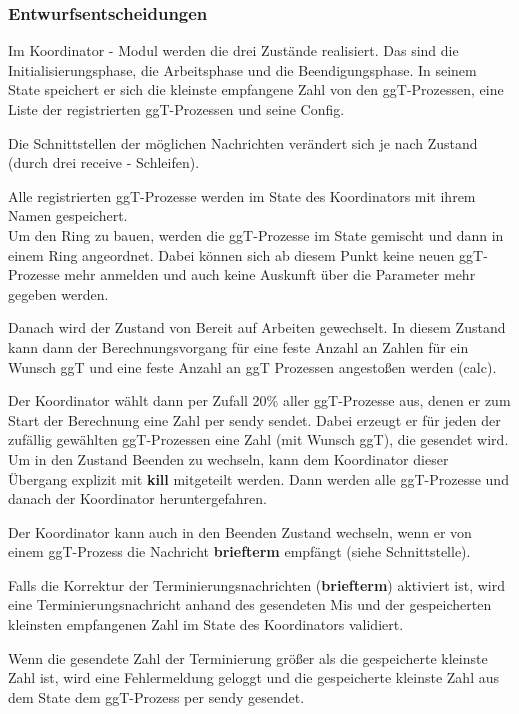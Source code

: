 \documentclass{article}
\begin{document}
\subsubsection{Entwurfsentscheidungen}
Im Koordinator - Modul werden die drei Zustände realisiert. Das sind die Initialisierungsphase, die Arbeitsphase und
die Beendigungsphase. In seinem State speichert er sich die kleinste empfangene Zahl von den ggT-Prozessen, eine Liste
der registrierten ggT-Prozessen und seine Config.

Die Schnittstellen der möglichen Nachrichten verändert sich je nach Zustand (durch drei receive - Schleifen).

Alle registrierten ggT-Prozesse werden im State des Koordinators mit ihrem Namen gespeichert.\\

Um den Ring zu bauen, werden die ggT-Prozesse im State gemischt und dann in einem Ring angeordnet. Dabei können sich
ab diesem Punkt keine neuen ggT-Prozesse mehr anmelden und auch keine Auskunft über die Parameter mehr gegeben werden.

Danach wird der Zustand von Bereit auf Arbeiten gewechselt. In diesem Zustand kann dann der Berechnungsvorgang für eine
feste Anzahl an Zahlen für ein Wunsch ggT und eine feste Anzahl an ggT Prozessen angestoßen werden (calc).

Der Koordinator wählt dann per Zufall 20\% aller ggT-Prozesse aus, denen er zum Start der Berechnung eine Zahl per sendy
sendet. Dabei erzeugt er für jeden der zufällig gewählten ggT-Prozessen eine Zahl (mit Wunsch ggT), die gesendet wird.\\

Um in den Zustand Beenden zu wechseln, kann dem Koordinator dieser Übergang explizit mit \textbf{kill} mitgeteilt werden.
Dann werden alle ggT-Prozesse und danach der Koordinator heruntergefahren.

Der Koordinator kann auch in den Beenden Zustand wechseln, wenn er von einem ggT-Prozess die Nachricht \textbf{briefterm}
empfängt (siehe Schnittstelle).

Falls die Korrektur der Terminierungsnachrichten (\textbf{briefterm}) aktiviert ist, wird eine Terminierungsnachricht
anhand des gesendeten Mis und der gespeicherten kleinsten empfangenen Zahl im State des Koordinators validiert.

Wenn die gesendete Zahl der Terminierung größer als die gespeicherte kleinste Zahl ist, wird eine Fehlermeldung geloggt
und die gespeicherte kleinste Zahl aus dem State dem ggT-Prozess per sendy gesendet.
\end{document}
